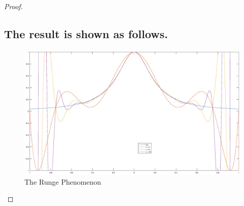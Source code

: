 \documentclass[48pt]{article}
\begin{document}
\begin{proof}
\subsection{The result is shown as follows.}
\begin{figure}[htbp]
\centering
\includegraphics[width = 15cm]{runge.eps}
\caption{The Runge Phenomenon}
\label{Runge}
\end{figure}
\end{proof}
\end{document}

